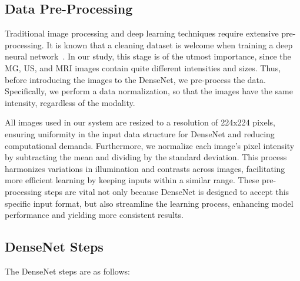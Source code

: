\subsection{Data Pre-Processing}
\label{sec:app004003003}

Traditional image processing and deep learning techniques require extensive pre-processing.
It is known that a cleaning dataset is welcome when training a deep neural network~\cite{RIASATIAN2021102032}.
In our study, this stage is of the utmost importance, since the \ac{MG}, \ac{US}, and \ac{MRI} images contain quite different intensities and sizes.
Thus, before introducing the images to the DenseNet, we pre-process the data.
Specifically, we perform a data normalization, so that the images have the same intensity, regardless of the modality.

All images used in our system are resized to a resolution of 224x224 pixels, ensuring uniformity in the input data structure for DenseNet and reducing computational demands.
Furthermore, we normalize each image's pixel intensity by subtracting the mean and dividing by the standard deviation.
This process harmonizes variations in illumination and contrasts across images, facilitating more efficient learning by keeping inputs within a similar range.
These pre-processing steps are vital not only because DenseNet is designed to accept this specific input format, but also streamline the learning process, enhancing model performance and yielding more consistent results.

\subsection{DenseNet Steps}
\label{sec:app004003004}

\vspace{2.50mm}

\noindent
The DenseNet steps are as follows:

\vspace{0.50mm}

